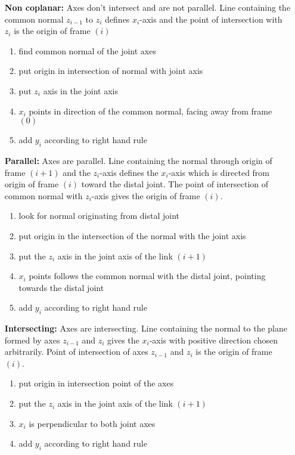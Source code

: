 \begin{itemize}[wide=\parindent] %
	\item[\textbf{Non coplanar:}] Axes don't intersect and are not parallel. Line containing the common normal $z_{i-1}$ to $z_i$ defines $x_i$-axis and the point of intersection with $z_i$ is the origin of frame $(i)$
	\begin{enumerate}[label=\emph{\alph*)}]
		\item find common normal of the joint axes
		\item put origin in intersection of normal with joint axis
		\item put $z_i$ axis in the joint axis
		\item $x_i$ points in direction of the common normal, facing away from frame $(0)$
		\item add $y_i$ according to right hand rule
	\end{enumerate}
	\item[\textbf{Parallel:}] Axes are parallel. Line containing the normal through origin of frame $(i+1)$ and the $z_i$-axis defines the $x_i$-axis which is directed from origin of frame $(i)$ toward the distal joint. The point of intersection of common normal with $z_i$-axis gives the origin of frame $(i)$. %
	\begin{enumerate}[label=\emph{\alph*)}]
		\item look for normal originating from distal joint
		\item put origin in the intersection of the normal with the joint axis
		\item put the $z_i$ axis in the joint axis of the link $(i+1)$ 
		\item $x_i$ points follows the common normal with the distal joint, pointing towards the distal joint
		\item add $y_i$ according to right hand rule
	\end{enumerate}
	\item[\textbf{Intersecting:}] Axes are intersecting. Line containing the normal to the plane formed by axes $z_{i-1}$ and  $z_i$ gives the $x_i$-axis with positive direction chosen arbitrarily. Point of intersection of  axes $z_{i-1}$  and  $z_i$ is the origin of frame $(i)$.
	\begin{enumerate}[label=\emph{\alph*)}]
		\item put origin in intersection point of the axes
		\item put the $z_i$ axis in the joint axis of the link $(i+1)$
		\item $x_i$ is perpendicular to both joint axes
		\item add $y_i$ according to right hand rule
	\end{enumerate}
\end{itemize}

